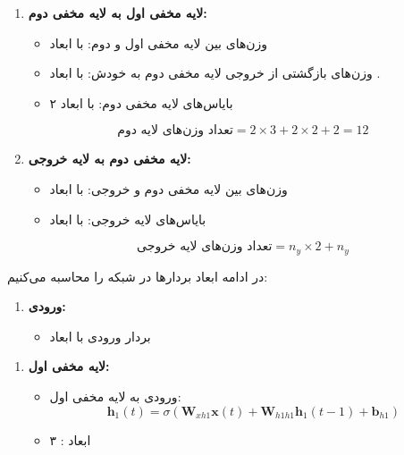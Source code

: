 \begin{enumerate}
\begin{qsolve}
\begin{enumerate}
	\item 
	\textbf{لایه مخفی اول به لایه مخفی دوم: }
	\begin{itemize}
		\item وزن‌های بین لایه مخفی اول و دوم:  با ابعاد 
		\item وزن‌های بازگشتی از خروجی لایه مخفی دوم به خودش:  با ابعاد .
		\item بایاس‌های لایه مخفی دوم:  با ابعاد ۲
	\end{itemize}
	\[
	\text{تعداد وزن‌های لایه دوم} = 2 \times 3 + 2 \times 2 + 2=12
	\]
	
	
	\item 
	\textbf{لایه مخفی دوم به لایه خروجی: }
	\begin{itemize}
		\item وزن‌های بین لایه مخفی دوم و خروجی:  با ابعاد 
		\item بایاس‌های لایه خروجی:  با ابعاد 
	\end{itemize}
	\[
	\text{تعداد وزن‌های لایه خروجی} = n_y \times 2 + n_y
	\]
\end{enumerate}



در ادامه ابعاد بردارها در شبکه را محاسبه می‌کنیم:
\begin{enumerate}
	\item
	\textbf{ورودی: }
	\begin{itemize}
		\item بردار ورودی  با ابعاد 
	\end{itemize}
\end{enumerate}
\end{qsolve}



\begin{qsolve}
	\begin{enumerate}
		\item
		\textbf{لایه مخفی اول: }
		\begin{itemize}
			\item ورودی به لایه مخفی اول: 
			\[
			\mathbf{h}_1(t) = \sigma(\mathbf{W}_{xh1} \mathbf{x}(t) + \mathbf{W}_{h1h1} \mathbf{h}_1(t-1) + \mathbf{b}_{h1}) 
			\]
			\item ابعاد : ۳
		\end{itemize}
		
		
		

\end{enumerate}
\end{qsolve}
\end{enumerate}
